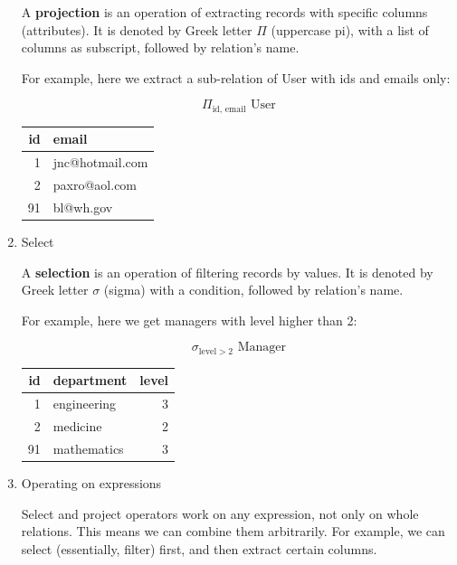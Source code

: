 \documentclass[12pt, a4paper, justified, notitlepage, sfsidenotes, notoc]{book}
\begin{document}
\begin{enumerate}
A \textbf{\textbf{projection}} is an operation of extracting records with specific columns (attributes). It is denoted by Greek letter \(\Pi\) (uppercase pi), with a list of columns as subscript, followed by relation's name.

For example, here we extract a sub-relation of User with ids and emails only:

\begin{equation}
\Pi_{\textrm{id, email}} \textrm{ User}
\end{equation}

\begin{center}
\begin{tabular}{rl}
id & email\\
\hline
1 & jnc@hotmail.com\\
2 & paxro@aol.com\\
91 & bl@wh.gov\\
\end{tabular}
\end{center}

\item Select
\label{sec:orgf18b051}

A \textbf{\textbf{selection}} is an operation of filtering records by values. It is denoted by Greek letter \(\sigma\) (sigma) with a condition, followed by relation's name.

For example, here we get managers with level higher than 2:

\begin{equation}
\sigma_{\textrm{level} > 2} \textrm{ Manager}
\end{equation}

\begin{center}
\begin{tabular}{rlr}
id & department & level\\
\hline
1 & engineering & 3\\
2 & medicine & 2\\
91 & mathematics & 3\\
\end{tabular}
\end{center}

\item Operating on expressions
\label{sec:orgb48c8b7}

Select and project operators work on any expression, not only on whole relations. This means we can combine them arbitrarily. For example, we can select (essentially, filter) first, and then extract certain columns.


\end{enumerate}
\end{document}
